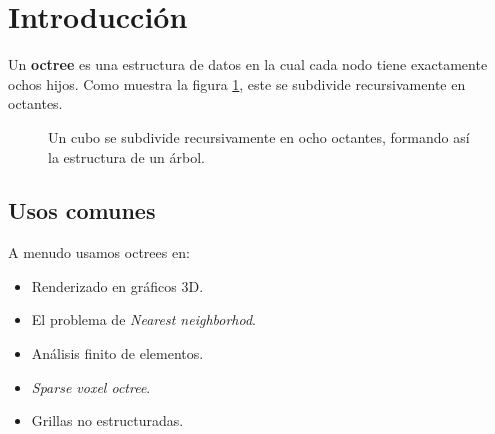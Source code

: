 \section{Introducción}
Un \textbf{octree} es una estructura de datos en la cual cada nodo tiene exactamente ochos hijos. Como muestra la figura \ref{fig:octree}, este se subdivide recursivamente en octantes.\cite{wiki:octree}
\begin{figure}[H]
  \centering
  \caption{Un cubo se subdivide recursivamente en ocho octantes, formando así la estructura de un árbol.}
  \label{fig:octree}
\end{figure}

\subsection{Usos comunes}
A menudo usamos octrees en:
\begin{itemize}
    \item Renderizado en gráficos 3D.
    \item El problema de \textit{Nearest neighborhod}.
    \item Análisis finito de elementos.
    \item \textit{Sparse voxel octree}.
    \item Grillas no estructuradas.
\end{itemize}